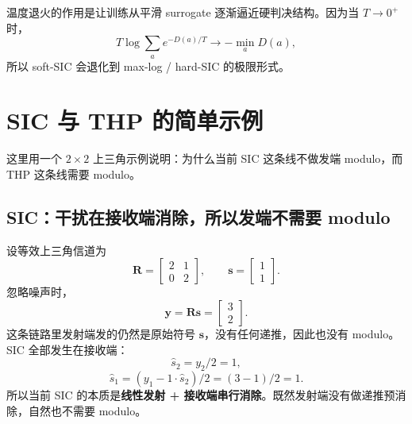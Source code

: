 \documentclass[11pt]{ctexart}
\begin{document}
温度退火的作用是让训练从平滑 surrogate 逐渐逼近硬判决结构。因为当 $T\to 0^+$ 时，
\begin{equation}
    T\log\sum_a e^{-D(a)/T}
    \to
    -\min_a D(a),
\end{equation}
所以 soft-SIC 会退化到 max-log / hard-SIC 的极限形式。

\section{SIC 与 THP 的简单示例}
这里用一个 $2\times 2$ 上三角示例说明：为什么当前 SIC 这条线不做发端 modulo，而 THP 这条线需要 modulo。

\subsection{SIC：干扰在接收端消除，所以发端不需要 modulo}
设等效上三角信道为
\begin{equation}
    \bm{R}
    =
    \begin{bmatrix}
        2 & 1\\
        0 & 2
    \end{bmatrix},
    \qquad
    \bm{s}
    =
    \begin{bmatrix}
        1\\
        1
    \end{bmatrix}.
\end{equation}
忽略噪声时，
\begin{equation}
    \bm{y}
    =
    \bm{R}\bm{s}
    =
    \begin{bmatrix}
        3\\
        2
    \end{bmatrix}.
\end{equation}
这条链路里发射端发的仍然是原始符号 $\bm{s}$，没有任何递推，因此也没有 modulo。SIC 全部发生在接收端：
\begin{equation}
    \hat{s}_2 = y_2 / 2 = 1,
\end{equation}
\begin{equation}
    \hat{s}_1 = (y_1 - 1\cdot \hat{s}_2)/2 = (3-1)/2 = 1.
\end{equation}
所以当前 SIC 的本质是\textbf{线性发射 + 接收端串行消除}。既然发射端没有做递推预消除，自然也不需要 modulo。
\end{document}
